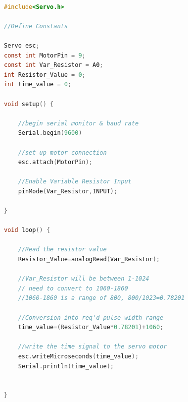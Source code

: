 \begin{lstlisting}[language=C]

#include<Servo.h>

//Define Constants

Servo esc;
const int MotorPin = 9;
const int Var_Resistor = A0;
int Resistor_Value = 0;
int time_value = 0;

void setup() {
	
	//begin serial monitor & baud rate
	Serial.begin(9600)
	
	//set up motor connection
	esc.attach(MotorPin);  
	
	//Enable Variable Resistor Input
	pinMode(Var_Resistor,INPUT); 
	
}

void loop() {
	
	//Read the resistor value 
	Resistor_Value=analogRead(Var_Resistor);
	
	//Var_Resistor will be between 1-1024
	// need to convert to 1060-1860
	//1060-1860 is a range of 800, 800/1023=0.78201
	
	//Conversion into req'd pulse width range
	time_value=(Resistor_Value*0.78201)+1060;
	
	//write the time signal to the servo motor
	esc.writeMicroseconds(time_value);
	Serial.println(time_value);
	
	
}

\end{lstlisting}
